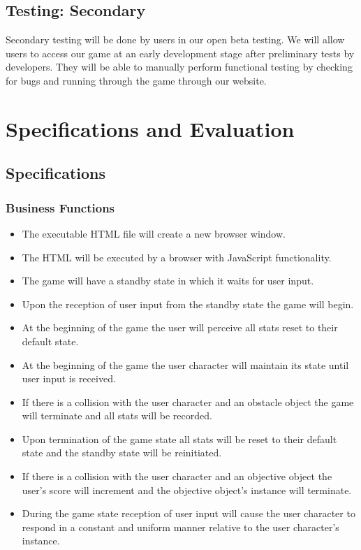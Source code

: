 \documentclass[11pt, oneside]{article}   	%
\begin{document}
\subsection{Testing: Secondary}
Secondary testing will be done by users in our open beta testing. We will allow users to access our game at an early development stage after preliminary tests by developers. They will be able to manually perform functional testing by checking for bugs and running through the game through our website. 

\newpage
\section{Specifications and Evaluation}
\subsection{Specifications}
\subsubsection*{Business Functions}
\begin{itemize}
\item The executable HTML file will create a new browser window.

\item The HTML will be executed by a browser with JavaScript functionality.

\item The game will have a standby state in which it waits for user input.

\item Upon the reception of user input from the standby state the game will begin.

\item At the beginning of the game the user will perceive all stats reset to their default state.

\item At the beginning of the game the user character will maintain its state until user input is received.

\item If there is a collision with the user character and an obstacle object the game will terminate and all stats will be recorded.

\item Upon termination of the game state all stats will be reset to their default state and the standby state will be reinitiated.

\item If there is a collision with the user character and an objective object the user's score will increment and the objective object's instance will terminate.

\item During the game state reception of user input will cause the user character to respond in a constant and uniform manner relative to the user character's instance.
\end{itemize}
\end{document}
